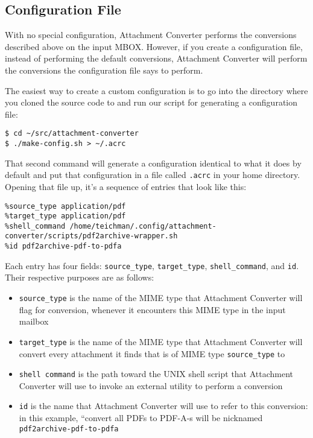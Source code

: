 \documentclass[11pt]{article}
\begin{document}
\subsection{Configuration File}
\label{sec:orgcfee049}

With no special configuration, Attachment Converter performs the
conversions described above on the input MBOX.  However, if you create
a configuration file, instead of performing the default conversions,
Attachment Converter will perform the conversions the configuration
file says to perform.

The easiest way to create a custom configuration is to go into the
directory where you cloned the source code to and run our script for
generating a configuration file:

\begin{verbatim}
$ cd ~/src/attachment-converter
$ ./make-config.sh > ~/.acrc
\end{verbatim}

That second command will generate a configuration identical to what it
does by default and put that configuration in a file called \texttt{.acrc} in
your home directory. Opening that file up, it's a sequence of entries
that look like this:

\footnotesize

\begin{verbatim}
%source_type application/pdf
%target_type application/pdf
%shell_command /home/teichman/.config/attachment-converter/scripts/pdf2archive-wrapper.sh
%id pdf2archive-pdf-to-pdfa
\end{verbatim}

\normalsize

Each entry has four fields: \texttt{source\_type}, \texttt{target\_type},
\texttt{shell\_command}, and \texttt{id}.  Their respective purposes are as follows:

\begin{itemize}
\item \texttt{source\_type} is the name of the MIME type that Attachment Converter
will flag for conversion, whenever it encounters this MIME type in
the input mailbox
\item \texttt{target\_type} is the name of the MIME type that Attachment Converter
will convert every attachment it finds that is of MIME type
\texttt{source\_type} to
\item \texttt{shell command} is the path toward the UNIX shell script that
Attachment Converter will use to invoke an external utility to
perform a conversion
\item \texttt{id} is the name that Attachment Converter will use to refer to this
conversion: in this example, ``convert all PDFs to PDF-A-s will be
nicknamed \texttt{pdf2archive-pdf-to-pdfa}
\end{itemize}
\end{document}
